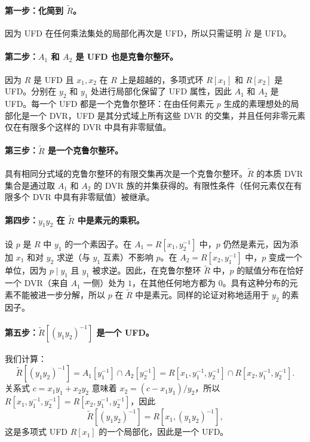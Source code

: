 \paragraph{第一步：化简到 $\tilde{R}$。} 因为 UFD 在任何乘法集处的局部化再次是 UFD，所以只需证明 $\tilde{R}$ 是 UFD。

\paragraph{第二步：$A_1$ 和 $A_2$ 是 UFD 也是克鲁尔整环。} 因为 $R$ 是 UFD 且 $x_1, x_2$ 在 $R$ 上是超越的，多项式环 $R[x_1]$ 和 $R[x_2]$ 是 UFD。分别在 $y_2$ 和 $y_1$ 处进行局部化保留了 UFD 属性，因此 $A_1$ 和 $A_2$ 是 UFD。每一个 UFD 都是一个克鲁尔整环：在由任何素元 $p$ 生成的素理想处的局部化是一个 DVR，UFD 是其分式域上所有这些 DVR 的交集，并且任何非零元素仅在有限多个这样的 DVR 中具有非零赋值。

\paragraph{第三步：$\tilde{R}$ 是一个克鲁尔整环。} 具有相同分式域的克鲁尔整环的有限交集再次是一个克鲁尔整环。$\tilde{R}$ 的本质 DVR 集合是通过取 $A_1$ 和 $A_2$ 的 DVR 族的并集获得的。有限性条件（任何元素仅在有限多个 DVR 中具有非零赋值）被继承。

\paragraph{第四步：$y_1 y_2$ 在 $\tilde{R}$ 中是素元的乘积。} 设 $p$ 是 $R$ 中 $y_1$ 的一个素因子。在 $A_1 = R[x_1, y_2^{-1}]$ 中，$p$ 仍然是素元，因为添加 $x_1$ 和对 $y_2$ 求逆（与 $y_1$ 互素）不影响 $p$。在 $A_2 = R[x_2, y_1^{-1}]$ 中，$p$ 变成一个单位，因为 $p \mid y_1$ 且 $y_1$ 被求逆。因此，在克鲁尔整环 $\tilde{R}$ 中，$p$ 的赋值分布在恰好一个 DVR（来自 $A_1$ 一侧）处为 $1$，在其他任何地方都为 $0$。具有这种分布的元素不能被进一步分解，所以 $p$ 在 $\tilde{R}$ 中是素元。同样的论证对称地适用于 $y_2$ 的素因子。

\paragraph{第五步：$\tilde{R}[(y_1 y_2)^{-1}]$ 是一个 UFD。} 我们计算：
\[
\tilde{R}[(y_1 y_2)^{-1}] = A_1[y_1^{-1}] \cap A_2[y_2^{-1}] = R[x_1, y_1^{-1}, y_2^{-1}] \cap R[x_2, y_1^{-1}, y_2^{-1}].
\]
关系式 $c = x_1 y_1 + x_2 y_2$ 意味着 $x_2 = (c - x_1 y_1)/y_2$，所以 $R[x_1, y_1^{-1}, y_2^{-1}] = R[x_2, y_1^{-1}, y_2^{-1}]$，因此
\[
\tilde{R}[(y_1 y_2)^{-1}] = R[x_1, (y_1 y_2)^{-1}],
\]
这是多项式 UFD $R[x_1]$ 的一个局部化，因此是一个 UFD。

